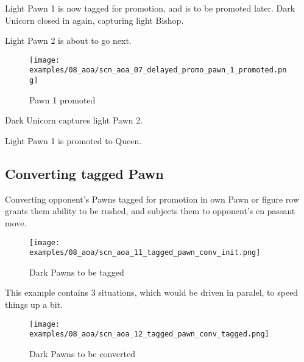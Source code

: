 Light Pawn 1 is now tagged for promotion, and is to be promoted later.
Dark Unicorn closed in again, capturing light Bishop.

Light Pawn 2 is about to go next.

\clearpage %

\noindent
\begin{figure}[h]
\texttt{[image: examples/08\_aoa/scn\_aoa\_07\_delayed\_promo\_pawn\_1\_promoted.png]}
\caption{Pawn 1 promoted}
\label{fig:scn_aoa_07_delayed_promo_pawn_1_promoted}
\end{figure}

Dark Unicorn captures light Pawn 2.

Light Pawn 1 is promoted to Queen.

\clearpage %

\subsection*{Converting tagged Pawn}

Converting opponent's Pawns tagged for promotion in own Pawn or figure row
grants them ability to be rushed, and subjects them to opponent's en passant
move.

\noindent
\begin{figure}[h]
\texttt{[image: examples/08\_aoa/scn\_aoa\_11\_tagged\_pawn\_conv\_init.png]}
\caption{Dark Pawns to be tagged}
\label{fig:scn_aoa_11_tagged_pawn_conv_init}
\end{figure}

This example contains 3 situations, which would be driven in paralel, to speed
things up a bit.

\clearpage %

\noindent
\begin{figure}[h]
\texttt{[image: examples/08\_aoa/scn\_aoa\_12\_tagged\_pawn\_conv\_tagged.png]}
\caption{Dark Pawns to be converted}
\label{fig:scn_aoa_12_tagged_pawn_conv_tagged}
\end{figure}

